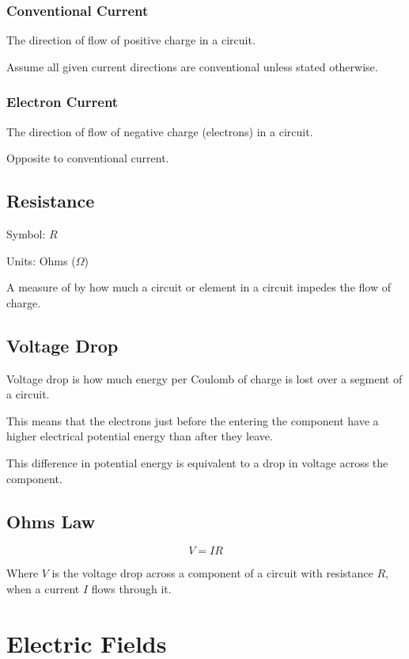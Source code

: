 \documentclass[a4paper,11pt]{report}
\begin{document}
\subsubsection{Conventional Current}

The direction of flow of positive charge in a circuit.

Assume all given current directions are conventional unless stated otherwise.

\subsubsection{Electron Current}

The direction of flow of negative charge (electrons) in a circuit.

Opposite to conventional current.

\subsection{Resistance}

Symbol: $R$

Units: Ohms ($\Omega$)

A measure of by how much a circuit or element in a circuit impedes the flow of
charge.

\subsection{Voltage Drop}

Voltage drop is how much energy per Coulomb of charge is lost over a segment of
a circuit.

This means that the electrons just before the entering the component have a
higher electrical potential energy than after they leave.

This difference in potential energy is equivalent to a drop in voltage across
the component.

\subsection{Ohms Law}

$$
V = IR
$$

Where $V$ is the voltage drop across a component of a circuit with resistance
$R$, when a current $I$ flows through it.


\section{Electric Fields}
\end{document}

